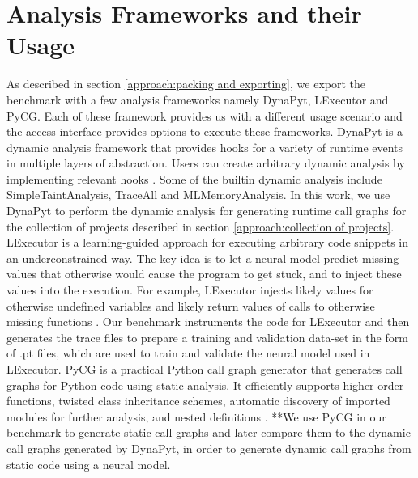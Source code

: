 \section{Analysis Frameworks and their Usage}
\label{approach:analysis framework}
As described in section \ref{approach:packing and exporting}, we export the benchmark with a few analysis frameworks namely DynaPyt, LExecutor and PyCG. Each of these framework provides us with a different usage scenario and the access interface provides options to execute these frameworks. DynaPyt is a dynamic analysis framework that provides hooks for a variety of runtime events in multiple layers of abstraction. Users can create arbitrary dynamic analysis by implementing relevant hooks \cite{DynaPyt2022}. Some of the builtin dynamic analysis include SimpleTaintAnalysis, TraceAll and MLMemoryAnalysis. In this work, we use DynaPyt to perform the dynamic analysis for generating runtime call graphs for the collection of projects described in section \ref{approach:collection of projects}. LExecutor is a learning-guided approach for executing arbitrary code snippets in an underconstrained way. The key idea is to let a neural model predict missing values that otherwise would cause the program to get stuck, and to inject these values into the execution. For example, LExecutor injects likely values for otherwise undefined variables and likely return values of calls to otherwise missing functions \cite{LExecutor_2023}. Our benchmark instruments the code for LExecutor and then generates the trace files to prepare a training and validation data-set in the form of .pt files, which are used to train and validate the neural model used in LExecutor. PyCG is a practical Python call graph generator that generates call graphs for Python code using static analysis. It efficiently supports higher-order functions, twisted class inheritance schemes, automatic discovery of imported modules for further analysis, and nested definitions \cite{PyCG_2021}. **We use PyCG in our benchmark to generate static call graphs and later compare them to the dynamic call graphs generated by DynaPyt, in order to generate dynamic call graphs from static code using a neural model.